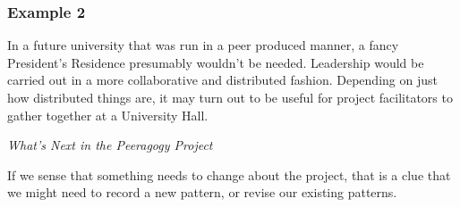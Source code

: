 \subsubsection*{Example 2}
In a future university that was run in a peer produced manner, a fancy
President's Residence presumably wouldn't be needed.  Leadership would
be carried out in a more collaborative and distributed fashion.  Depending
on just how distributed things are, it may turn out to be
useful for project facilitators to gather together at a University
Hall.

\begin{framed}
\noindent
\emph{What's Next in the Peeragogy Project}
\begin{collectinmacro}{\RoadmapWN}{}{}
If we sense that something needs to change about the project, that is a clue that we might need to record a new pattern, or revise our existing patterns.
\end{collectinmacro}
\RoadmapWN
\end{framed}

\newpage
